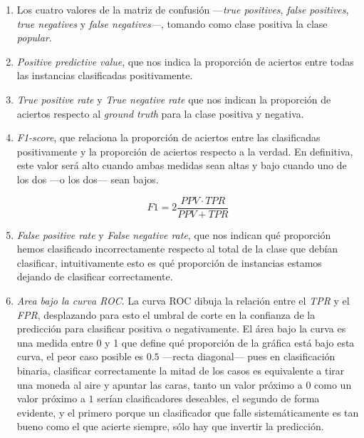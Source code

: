 \documentclass{article}
\newcommand{\img}[2]{
\noindent\makebox[\textwidth][c]{\texttt{[image: \#1]}}%
}
\begin{document}
\begin{enumerate}

\item Los cuatro valores de la matriz de confusión ---\textit{true positives}, \textit{false positives}, \textit{true negatives} y \textit{false negatives---}, tomando como clase positiva la clase \textit{popular}.

\item \textit{Positive predictive value}, que nos indica la proporción de aciertos entre todas las instancias clasificadas positivamente.

\item \textit{True positive rate} y \textit{True negative rate} que nos indican la proporción de aciertos respecto al \textit{ground truth} para la clase positiva y negativa.

\item \textit{F1-score}, que relaciona la proporción de aciertos entre las clasificadas positivamente y la proporción de aciertos respecto a la verdad. En definitiva, este valor será alto cuando ambas medidas sean altas y bajo cuando uno de los dos ---o los dos--- sean bajos.

\[ F1 = 2\frac{PPV \cdot TPR}{PPV+TPR} \]

\item \textit{False positive rate} y \textit{False negative rate}, que nos indican qué proporción hemos clasificado incorrectamente respecto al total de la clase que debían clasificar, intuitivamente esto es qué proporción de instancias estamos dejando de clasificar correctamente.

\item \textit{Area bajo la curva ROC}. La curva ROC dibuja la relación entre el \textit{TPR} y el \textit{FPR}, desplazando para esto el umbral de corte en la confianza de la predicción para clasificar positiva o negativamente. El área bajo la curva es una medida entre 0 y 1 que define qué proporción de la gráfica está bajo esta curva, el peor caso posible es $0.5$ ---recta diagonal--- pues en clasificación binaria, clasificar correctamente la mitad de los casos es equivalente a tirar una moneda al aire y apuntar las caras, tanto un valor próximo a $0$ como un valor próximo a $1$ serían clasificadores deseables, el segundo de forma evidente, y el primero porque un clasificador que falle sistemáticamente es tan bueno como el que acierte siempre, sólo hay que invertir la predicción.

\img{roc}{0.5}


\end{enumerate}
\end{document}
